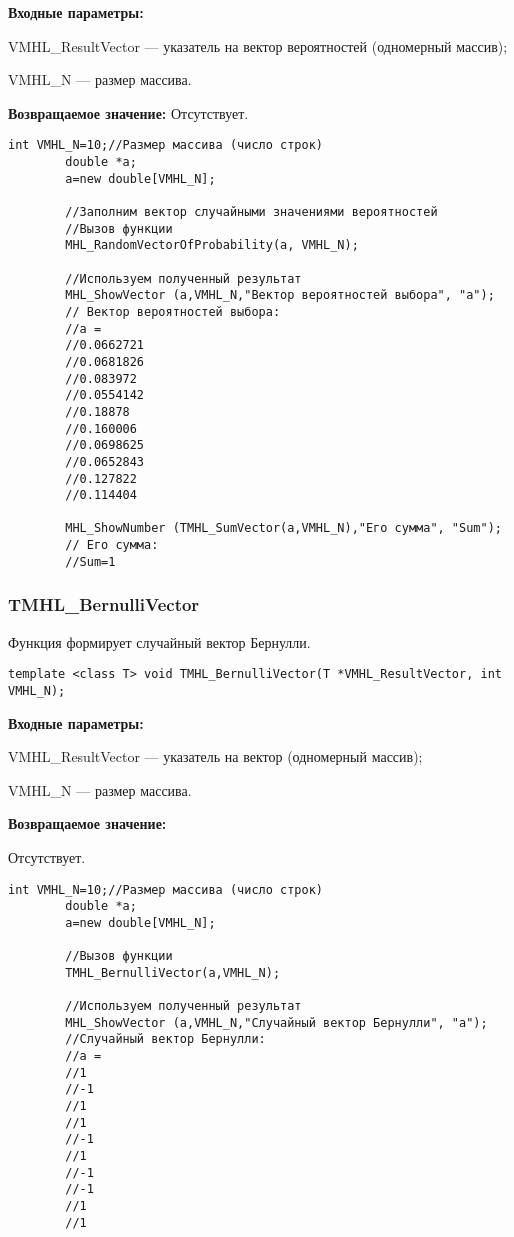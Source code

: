\documentclass[a4paper,12pt]{article}
\begin{document}
\textbf{Входные параметры:}

 VMHL\_ResultVector --- указатель на вектор вероятностей (одномерный массив);
 
 VMHL\_N --- размер массива.

\textbf{Возвращаемое значение:}
Отсутствует.


\begin{lstlisting}[label=code_use_MHL_RandomVectorOfProbability,caption=Пример использования]
        int VMHL_N=10;//Размер массива (число строк)
        double *a;
        a=new double[VMHL_N];

        //Заполним вектор случайными значениями вероятностей
        //Вызов функции
        MHL_RandomVectorOfProbability(a, VMHL_N);

        //Используем полученный результат
        MHL_ShowVector (a,VMHL_N,"Вектор вероятностей выбора", "a");
        // Вектор вероятностей выбора:
        //a =	
        //0.0662721
        //0.0681826
        //0.083972
        //0.0554142
        //0.18878
        //0.160006
        //0.0698625
        //0.0652843
        //0.127822
        //0.114404         

        MHL_ShowNumber (TMHL_SumVector(a,VMHL_N),"Его сумма", "Sum");
        // Его сумма:
        //Sum=1
\end{lstlisting}

\subsubsection{TMHL\_BernulliVector}\label{TMHL_BernulliVector}

Функция формирует случайный вектор Бернулли.


\begin{lstlisting}[label=code_syntax_TMHL_BernulliVector,caption=Синтаксис]
template <class T> void TMHL_BernulliVector(T *VMHL_ResultVector, int VMHL_N);
\end{lstlisting}

\textbf{Входные параметры:} 
 
VMHL\_ResultVector --- указатель на вектор (одномерный массив);
 
VMHL\_N --- размер массива.

\textbf{Возвращаемое значение:}

Отсутствует.


\begin{lstlisting}[label=code_use_TMHL_BernulliVector,caption=Пример использования]
        int VMHL_N=10;//Размер массива (число строк)
        double *a;
        a=new double[VMHL_N];

        //Вызов функции
        TMHL_BernulliVector(a,VMHL_N);

        //Используем полученный результат
        MHL_ShowVector (a,VMHL_N,"Случайный вектор Бернулли", "a");
		//Случайный вектор Бернулли:
        //a =
        //1
        //-1
        //1
        //1
        //-1
        //1
        //-1
        //-1
        //1
        //1
\end{lstlisting}
\end{document}
